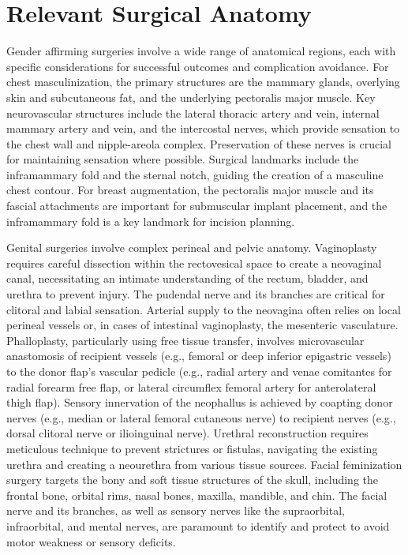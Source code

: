\section*{Relevant Surgical Anatomy}
Gender affirming surgeries involve a wide range of anatomical regions, each with specific considerations for successful outcomes and complication avoidance. For chest masculinization, the primary structures are the mammary glands, overlying skin and subcutaneous fat, and the underlying pectoralis major muscle. Key neurovascular structures include the lateral thoracic artery and vein, internal mammary artery and vein, and the intercostal nerves, which provide sensation to the chest wall and nipple-areola complex. Preservation of these nerves is crucial for maintaining sensation where possible. Surgical landmarks include the inframammary fold and the sternal notch, guiding the creation of a masculine chest contour. For breast augmentation, the pectoralis major muscle and its fascial attachments are important for submuscular implant placement, and the inframammary fold is a key landmark for incision planning.

Genital surgeries involve complex perineal and pelvic anatomy. Vaginoplasty requires careful dissection within the rectovesical space to create a neovaginal canal, necessitating an intimate understanding of the rectum, bladder, and urethra to prevent injury. The pudendal nerve and its branches are critical for clitoral and labial sensation. Arterial supply to the neovagina often relies on local perineal vessels or, in cases of intestinal vaginoplasty, the mesenteric vasculature. Phalloplasty, particularly using free tissue transfer, involves microvascular anastomosis of recipient vessels (e.g., femoral or deep inferior epigastric vessels) to the donor flap's vascular pedicle (e.g., radial artery and venae comitantes for radial forearm free flap, or lateral circumflex femoral artery for anterolateral thigh flap). Sensory innervation of the neophallus is achieved by coapting donor nerves (e.g., median or lateral femoral cutaneous nerve) to recipient nerves (e.g., dorsal clitoral nerve or ilioinguinal nerve). Urethral reconstruction requires meticulous technique to prevent strictures or fistulas, navigating the existing urethra and creating a neourethra from various tissue sources. Facial feminization surgery targets the bony and soft tissue structures of the skull, including the frontal bone, orbital rims, nasal bones, maxilla, mandible, and chin. The facial nerve and its branches, as well as sensory nerves like the supraorbital, infraorbital, and mental nerves, are paramount to identify and protect to avoid motor weakness or sensory deficits.

